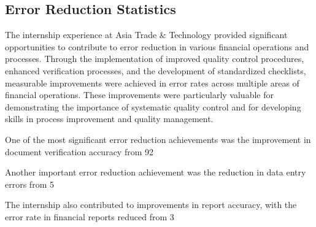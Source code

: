 \subsection{Error Reduction Statistics}
The internship experience at Asia Trade \& Technology provided significant opportunities to contribute to error reduction in various financial operations and processes. Through the implementation of improved quality control procedures, enhanced verification processes, and the development of standardized checklists, measurable improvements were achieved in error rates across multiple areas of financial operations. These improvements were particularly valuable for demonstrating the importance of systematic quality control and for developing skills in process improvement and quality management.

One of the most significant error reduction achievements was the improvement in document verification accuracy from 92%

Another important error reduction achievement was the reduction in data entry errors from 5%

The internship also contributed to improvements in report accuracy, with the error rate in financial reports reduced from 3%

